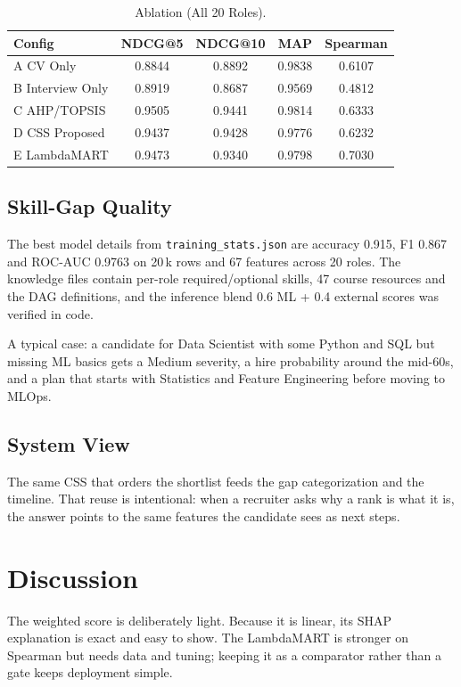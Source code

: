 \documentclass[conference]{IEEEtran}
\begin{document}
\begin{table}[htbp]
\caption{Ablation (All 20 Roles).}
\begin{center}
\begin{tabular}{lcccc}
\toprule
\textbf{Config} & \textbf{NDCG@5} & \textbf{NDCG@10} & \textbf{MAP} & \textbf{Spearman} \\
\midrule
A CV Only        & 0.8844 & 0.8892 & 0.9838 & 0.6107 \\
B Interview Only & 0.8919 & 0.8687 & 0.9569 & 0.4812 \\
C AHP/TOPSIS     & 0.9505 & 0.9441 & 0.9814 & 0.6333 \\
D CSS Proposed   & 0.9437 & 0.9428 & 0.9776 & 0.6232 \\
E LambdaMART     & 0.9473 & 0.9340 & 0.9798 & 0.7030 \\
\bottomrule
\end{tabular}
\label{tab:ablation}
\end{center}
\end{table}

\subsection{Skill-Gap Quality}
The best model details from \texttt{training\_stats.json} are accuracy 0.915, F1 0.867 and ROC-AUC 0.9763 on 20\,k rows and 67 features across 20 roles. The knowledge files contain per-role required/optional skills, 47 course resources and the DAG definitions, and the inference blend 0.6 ML + 0.4 external scores was verified in code.

A typical case: a candidate for Data Scientist with some Python and SQL but missing ML basics gets a Medium severity, a hire probability around the mid-60s, and a plan that starts with Statistics and Feature Engineering before moving to MLOps.

\subsection{System View}
The same CSS that orders the shortlist feeds the gap categorization and the timeline. That reuse is intentional: when a recruiter asks why a rank is what it is, the answer points to the same features the candidate sees as next steps.

\section{Discussion}
The weighted score is deliberately light. Because it is linear, its SHAP explanation is exact and easy to show. The LambdaMART is stronger on Spearman but needs data and tuning; keeping it as a comparator rather than a gate keeps deployment simple.
\end{document}
